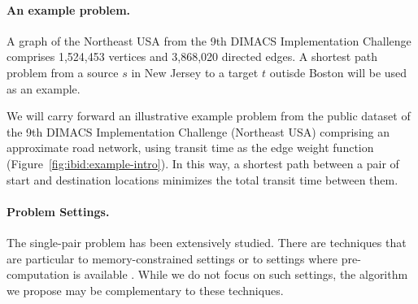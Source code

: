 \paragraph{An example problem.}
\begin{marginfigure}%
   \centering%
   \caption{A graph of the Northeast USA from the 9th DIMACS
      Implementation Challenge
      comprises 1,524,453 vertices and 3,868,020 directed edges.
      A shortest path problem from a source $s$ in New Jersey
      to a target $t$ outisde Boston
      will be used as an example.}%
   \label{fig:ibid:example-intro}%
\end{marginfigure}
We will carry forward an illustrative example problem from
the public dataset of the 9th DIMACS Implementation Challenge
\citep{demetrescuetal2006dimacs9}
(Northeast USA)
comprising an approximate road network,
using transit time as the edge weight function
(Figure~\ref{fig:ibid:example-intro}).
In this way,
a shortest path between a pair of start and destination locations
minimizes the total transit time between them.

\paragraph{Problem Settings.}
The single-pair problem has been extensively studied.
There are techniques that are particular to memory-constrained
settings \citep{kaindl1997biheurreconsidered}
or to settings where pre-computation is available
\citep{goldberg2007pointtopoint}.
While we do not focus on such settings,
the algorithm we propose may be complementary to these techniques.

